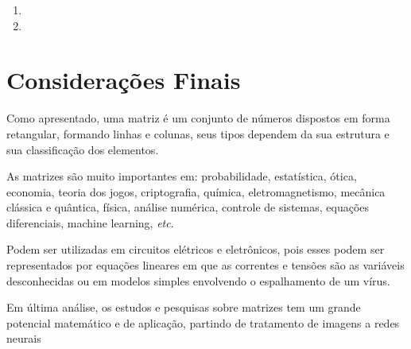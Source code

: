 \documentclass[a4paper,12pt]{article}
\begin{document}
 \begin{enumerate}
 
    \item
    
 

    \item

    
 \end{enumerate}
 
\newpage

\section{Considerações Finais}

Como apresentado, uma matriz é um conjunto de números dispostos em forma retangular, formando linhas e colunas, seus tipos dependem da sua estrutura e sua classificação dos elementos.

As matrizes são muito importantes em: probabilidade, estatística, ótica, economia, teoria dos jogos, criptografia, química, eletromagnetismo, mecânica clássica e quântica, física, análise numérica, controle de sistemas, equações diferenciais, machine learning, \textit{etc}.

Podem ser utilizadas em circuitos elétricos e eletrônicos, pois esses podem ser representados por equações lineares em que as correntes e tensões são as variáveis desconhecidas ou em modelos simples envolvendo o espalhamento de um vírus.

Em última análise, os estudos e pesquisas sobre matrizes tem um grande potencial matemático e de aplicação, partindo de tratamento de imagens a redes neurais

\newpage


\end{document}
